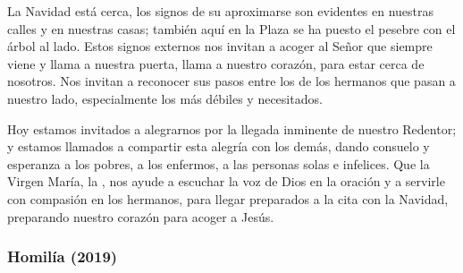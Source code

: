 \begin{body}
					La Navidad está cerca, los signos de su aproximarse son evidentes en nuestras calles y en nuestras casas; también aquí en la Plaza se ha puesto el pesebre con el árbol al lado. Estos signos externos nos invitan a acoger al Señor que siempre viene y llama a nuestra puerta, llama a nuestro corazón, para estar cerca de nosotros. Nos invitan a reconocer sus pasos entre los de los hermanos que pasan a nuestro lado, especialmente los más débiles y necesitados.
					
					Hoy estamos invitados a alegrarnos por la llegada inminente de nuestro Redentor; y estamos llamados a compartir esta alegría con los demás, dando consuelo y esperanza a los pobres, a los enfermos, a las personas solas e infelices. Que la Virgen María, la , nos ayude a escuchar la voz de Dios en la oración y a servirle con compasión en los hermanos, para llegar preparados a la cita con la Navidad, preparando nuestro corazón para acoger a Jesús.
				\end{body}
			
			\subsubsection{Homilía (2019)}
			
				
